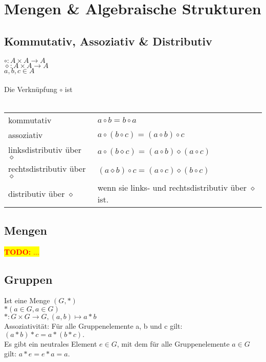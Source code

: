 \documentclass[10pt,a4paper]{article}
\newcommand{\todo}[1]{\begin{flushleft} \colorbox{yellow}{\textcolor{red}{\textbf{TODO:} {#1}}}\end{flushleft} }
\begin{document}
\section{Mengen \& Algebraische Strukturen}

\subsection{Kommutativ, Assoziativ \& Distributiv}

${\circ}\colon A \times A\to A $\\
${\diamond}\colon A \times A\to A$ \\
$a,b,c\in A $ \\
\\
Die Verknüpfung $\circ$ ist\\
\\
\begin{tabular}{ll}
kommutativ & $a \circ b = b \circ a$ \\ 
assoziativ & $ a \circ \left( b \circ c \right) = \left( a \circ b \right) \circ c $ \\  
linksdistributiv über $\diamond$ & $a \circ (b \diamond c) = (a \circ b) \diamond (a \circ c)$ \\ 
rechtsdistributiv über $\diamond$ & $(a \diamond b) \circ c = (a \circ c) \diamond (b \circ c)$ \\ 
distributiv über $\diamond$ & wenn sie links- und rechtsdistributiv über $\diamond$ ist.
\end{tabular} 




\subsection{Mengen}
\todo{...}

\subsection{Gruppen}
Ist eine Menge
$(G,*)$\\
$*(a \in G, a \in G)$\\
$*\colon G\times G\to G,(a,b)\mapsto a*b $\\

Assoziativität: Für alle Gruppenelemente a, b und c gilt: $(a*b)*c=a*(b*c).$ \\

Es gibt ein neutrales Element $e\in G$, mit dem für alle Gruppenelemente $a\in G$ gilt: $a*e=e*a=a$.\\
\end{document}
